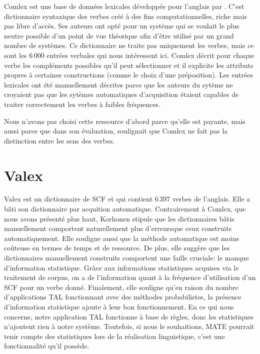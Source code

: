 Comlex est une base de données lexicales développée pour l'anglais par \cite{Grishman:1994:CSB:991886.991931}. C'est dictionnaire syntaxique des verbes créé à des fins computationnelles, riche mais pas libre d'accès. Ses auteurs ont opté pour un système qui se voulait le plus neutre possible d'un point de vue théorique afin d'être utilisé par un grand nombre de systèmes. Ce dictionnaire ne traite pas uniquement les verbes, mais ce sont les 6\,000 entrées verbales qui nous intéressent ici. Comlex décrit pour chaque verbe les compléments possibles qu'il peut sélectionner et il explicite les attributs propres à certaines constructions (comme le choix d'une préposition). Les entrées lexicales ont été manuellement décrites parce que les auteurs du sytème ne croyaient pas que les sytèmes automatiques d'acquisition étaient capables de traiter correctement les verbes à faibles fréquences.

Nous n'avons pas choisi cette ressource d'abord parce qu'elle est payante, mais aussi parce que dans son évaluation, \cite{SchulerVerbnetBroadcoverageComprehensive2005} soulignait que Comlex ne fait pas la distinction entre les sens des verbes.

\section{Valex}
 
Valex est un dictionnaire de \ac{SCF} et \cite{Korhonenlargesubcategorizationlexicon2006} qui contient 6\,397 verbes de l'anglais. Elle a bâti son dictionnaire par acquition automatique. Contrairement à Comlex, que nous avons présenté plus haut, Korhonen stipule que les dictionnaires bâtis manuellement comportent naturellement plus d'erreursque ceux construits automatiquement. Elle souligne aussi que la méthode automatique est moins coûteuse en termes de temps et de ressource. De plus, elle suggère que les dictionnaires manuellement construits comportent une faille cruciale: le manque d'information statistique. Grâce aux informations statistiques acquises via le traitement de corpus, on a de l'information quant à la fréquence d'utilisation d'un \ac{SCF} pour un verbe donné. Finalement, elle souligne qu'en raison du nombre d'applications \ac{TAL} fonctionnant avec des méthodes probabilistes, la présence d'information statistique ajoute à leur bon fonctionnement. En ce qui nous concerne, notre application \ac{TAL} fonctionne à base de règles, donc les statistiques n'ajoutent rien à notre système. Toutefois, si nous le souhaitions, MATE \citep{BohnetDevelopmentEnvironmentMTTbased2000a,BOHNET10,bohnet07} pourrait tenir compte des statistiques lors de la réalisation linguistique, c'est une fonctionnalité qu'il possède.

